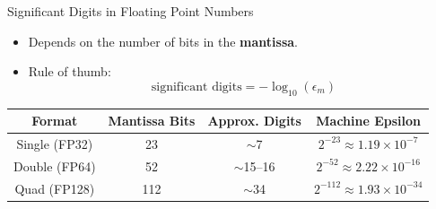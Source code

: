 \documentclass[10pt]{beamer}
\begin{document}
\begin{frame}{Significant Digits in Floating Point Numbers}

\begin{itemize}
  \item Depends on the number of bits in the \textbf{mantissa}.
  \item Rule of thumb:
  $$
    \text{significant digits} =-\log_{10}(\epsilon_m)
  $$
\end{itemize}

\vspace{3mm}
\begin{center}
\begin{tabular}{|c|c|c|c|}
\hline
\textbf{Format} & \textbf{Mantissa Bits} & \textbf{Approx. Digits} & \textbf{Machine Epsilon} \\
\hline
Single (FP32)   & 23    & $\sim$7    & $2^{-23} \approx 1.19\times10^{-7}$ \\
Double (FP64)   & 52    & $\sim$15–16 & $2^{-52} \approx 2.22\times10^{-16}$ \\
Quad (FP128)    & 112   & $\sim$34   & $2^{-112} \approx 1.93\times10^{-34}$ \\
\hline
\end{tabular}
\end{center}

\end{frame}
\end{document}
